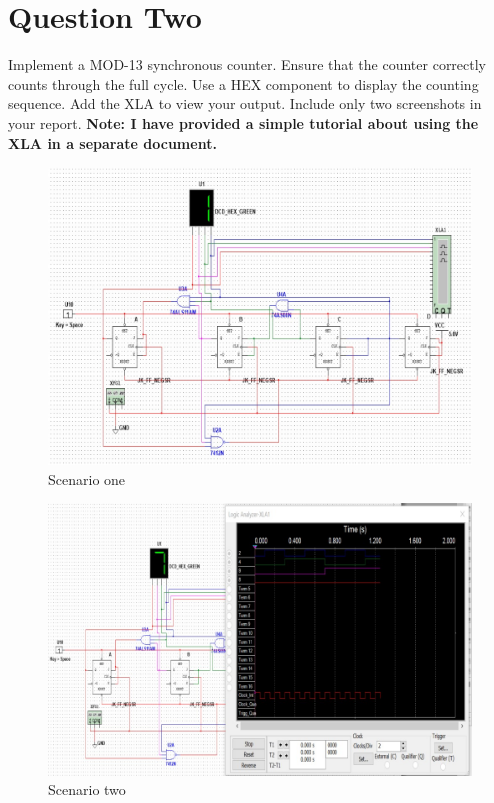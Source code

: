 \documentclass[a4paper,12]{article}
\begin{document}
\section{Question Two}
Implement a MOD-13 synchronous counter. Ensure that the counter correctly counts through the full cycle. Use a HEX component to display the counting sequence. Add the XLA to view your output. Include only two screenshots in your report. \textbf{Note: I have provided a simple tutorial about using the XLA in a separate document.}
\begin{figure}[H]
    \centering
    \includegraphics[width=\textwidth]{n21.jpg}
    \caption{Scenario one}
    \label{fig:1ae}
\end{figure}
\begin{figure}[H]
    \centering
    \includegraphics[width=\textwidth]{n22.jpg}
    \caption{Scenario two}
    \label{fig:1ae}
\end{figure}
\end{document}
